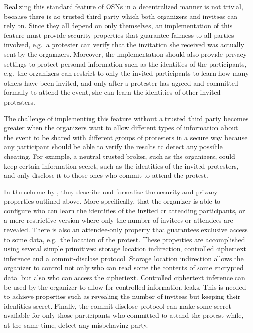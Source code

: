 
Realizing this standard feature of \acp{OSN} in a decentralized manner is not 
trivial, because there is no trusted third party which both organizers and 
invitees can rely on. %
Since they %
 all depend on only themselves, an implementation of this feature 
must provide security properties that guarantee fairness to all parties 
involved, e.g.\  a protester can verify that the invitation she received was 
actually sent by the organizers.
Moreover, the implementation should also provide privacy settings to protect 
personal information such as the identities of the participants, e.g.\ the 
organizers can restrict to only the invited participants to learn how many 
others have been invited, and only after a protester has agreed and committed 
formally to attend the event, she can learn the identities of other invited 
protesters.

The challenge of implementing this feature without a trusted third party 
becomes greater when the organizers want to allow different types of 
information about the event to be shared with different groups of protesters in 
a secure way because any participant should be able to verify the results to 
detect any possible cheating.
For example, a neutral trusted broker, such as the organizers, could keep 
certain information secret, such as the identities of the invited protesters, 
and only disclose it to those ones who commit to attend the protest. 

In the scheme by \citet{EventsInvitations}, they describe and formalize the 
security and privacy properties outlined above.
More specifically, that the organizer is able to configure who can learn the 
identities of the invited or attending participants, or a more restrictive 
version where only the number of invitees or attendees are revealed.
There is also an attendee-only property that guarantees exclusive access to 
some data, e.g.\ the location of the protest.
These properties are accomplished using several simple primitives:
storage location indirection, controlled ciphertext inference and 
a commit-disclose protocol.
Storage location indirection allows the organizer to control not only who can 
read some the contents of some encrypted data, but also who can access the 
ciphertext.
Controlled ciphertext inference can be used by the organizer to allow for 
controlled information leaks.
This is needed to achieve properties such as revealing the number of invitees 
but keeping their identities secret.
Finally, the commit-disclose protocol can make some secret available for only 
those participants who committed to attend the protest while, at the same time, 
detect any misbehaving party.
